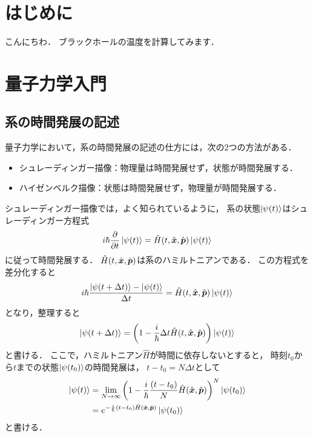\documentclass[uplatex,dvipdfmx]{vkaishi}
\begin{document}

\vcmaketitle %



\section*{はじめに}
こんにちわ．
ブラックホールの温度を計算してみます．

\section{量子力学入門}

\subsection{系の時間発展の記述}

量子力学において，系の時間発展の記述の仕方には，次の2つの方法がある．
\begin{itemize}
  \item シュレーディンガー描像：物理量は時間発展せず，状態が時間発展する．
  \item ハイゼンベルク描像：状態は時間発展せず，物理量が時間発展する．
\end{itemize}

シュレーディンガー描像では，よく知られているように，
系の状態$\ket{\psi(t)}$はシュレーディンガー方程式
\begin{align}
  i\hbar \pdv{t} \ket{\psi(t)} = \hat H(t, \hat{\vb*x}, \hat{\vb*p}) \ket{\psi(t)}
\end{align}
に従って時間発展する．
$\hat H(t, \hat{\vb*x}, \hat{\vb*p})$は系のハミルトニアンである．
この方程式を差分化すると
\begin{align*}
  i\hbar \frac{\ket{\psi(t + \Delta t)} - \ket{\psi(t)}}{\Delta t}
  = \hat H(t, \hat{\vb*x}, \hat{\vb*p}) \ket{\psi(t)}
\end{align*}
となり，整理すると
\begin{align}
  \ket{\psi(t + \Delta t)}
  = \qty(1 - \frac{i}{\hbar} \Delta t \hat H(t, \hat{\vb*x}, \hat{\vb*p})) \ket{\psi(t)}
\end{align}
と書ける．
ここで，ハミルトニアン$\hat H$が時間に依存しないとすると，
時刻$t_0$から$t$までの状態$\ket{\psi(t_0)}$の時間発展は，
$t - t_0 = N \Delta t$として
\begin{align*}
  \ket{\psi(t)}
  &= \lim_{N\to\infty} \qty(1 - \frac{i}{\hbar} \frac{(t - t_0)}{N} \hat H(\hat{\vb*x}, \hat{\vb*p}))^N \ket{\psi(t_0)} \\
  &= e^{- \frac{i}{\hbar} (t - t_0) \hat H(\hat{\vb*x}, \hat{\vb*p})} \ket{\psi(t_0)}
\end{align*}
と書ける．
\end{document}
